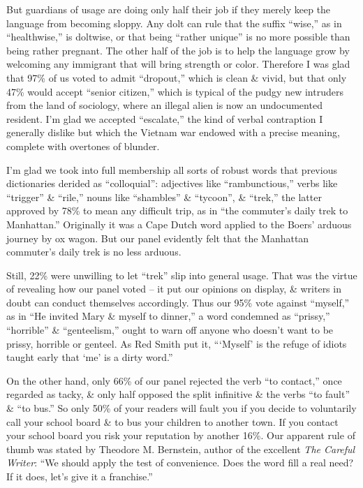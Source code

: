 \documentclass{article}
\begin{document}
But guardians of usage are doing only half their job if they merely keep the language from becoming sloppy. Any dolt can rule that the suffix ``wise,'' as in ``healthwise,'' is doltwise, or that being ``rather unique'' is no more possible than being rather pregnant. The other half of the job is to help the language grow by welcoming any immigrant that will bring strength or color. Therefore I was glad that 97\% of us voted to admit ``dropout,'' which is clean \& vivid, but that only 47\% would accept ``senior citizen,'' which is typical of the pudgy new intruders from the land of sociology, where an illegal alien is now an undocumented resident. I'm glad we accepted ``escalate,'' the kind of verbal contraption I generally dislike but which the Vietnam war endowed with a precise meaning, complete with overtones of blunder.

I'm glad we took into full membership all sorts of robust words that previous dictionaries derided as ``colloquial'': adjectives like ``rambunctious,'' verbs like ``trigger'' \& ``rile,'' nouns like ``shambles'' \& ``tycoon'', \& ``trek,'' the latter approved by 78\% to mean any difficult trip, as in ``the commuter's daily trek to Manhattan.'' Originally it was a Cape Dutch word applied to the Boers' arduous journey by ox wagon. But our panel evidently felt that the Manhattan commuter's daily trek is no less arduous.

Still, 22\% were unwilling to let ``trek'' slip into general usage. That was the virtue of revealing how our panel voted -- it put our opinions on display, \& writers in doubt can conduct themselves accordingly. Thus our 95\% vote against ``myself,'' as in ``He invited Mary \& myself to dinner,'' a word condemned as ``prissy,'' ``horrible'' \& ``genteelism,'' ought to warn off anyone who doesn't want to be prissy, horrible or genteel. As Red Smith put it, ```Myself' is the refuge of idiots taught early that `me' is a dirty word.''

On the other hand, only 66\% of our panel rejected the verb ``to contact,'' once regarded as tacky, \& only half opposed the split infinitive \& the verbs ``to fault'' \& ``to bus.'' So only 50\% of your readers will fault you if you decide to voluntarily call your school board \& to bus your children to another town. If you contact your school board you risk your reputation by another 16\%. Our apparent rule of thumb was stated by Theodore M. Bernstein, author of the excellent \textit{The Careful Writer}: ``We should apply the test of convenience. Does the word fill a real need? If it does, let's give it a franchise.''
\end{document}
